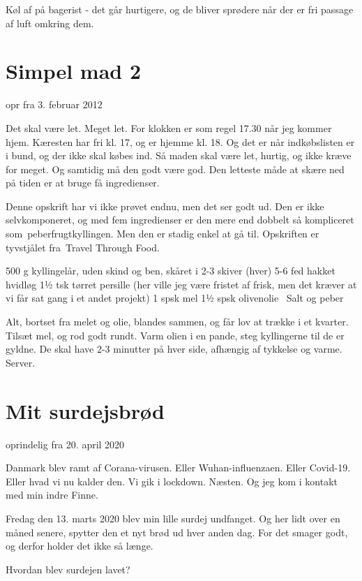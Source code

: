 \documentclass[
  letterpaper,
  DIV=11,
  numbers=noendperiod]{scrreprt}
\begin{document}
Køl af på bagerist - det går hurtigere, og de bliver sprødere når der er
fri passage af luft omkring dem.

\hypertarget{simpel-mad-2}{%
\section{Simpel mad 2}\label{simpel-mad-2}}

opr fra 3. februar 2012

Det skal være let. Meget let. For klokken er som regel 17.30 når jeg
kommer hjem. Kæresten har fri kl. 17, og er hjemme kl. 18. Og det er når
indkøbslisten er i bund, og der ikke skal købes ind. Så maden skal være
let, hurtig, og ikke kræve for meget. Og samtidig må den godt være god.
Den letteste måde at skære ned på tiden er at bruge få ingredienser.~

Denne opskrift har vi ikke prøvet endnu, men det ser godt ud. Den er
ikke selvkomponeret, og med fem ingredienser er den mere end dobbelt så
kompliceret som~peberfrugtkyllingen. Men den er stadig enkel at gå til.
Opskriften er tyvstjålet fra~Travel Through Food.

500 g kyllingelår, uden skind og ben, skåret i 2-3 skiver (hver) 5-6 fed
hakket hvidløg 1½ tsk tørret persille (her ville jeg være fristet af
frisk, men det kræver at vi får sat gang i et andet projekt) 1 spsk mel
1½ spsk olivenolie~ Salt og peber

Alt, bortset fra melet og olie, blandes sammen, og får lov at trække i
et kvarter. Tilsæt mel, og rod godt rundt. Varm olien i en pande, steg
kyllingerne til de er gyldne. De skal have 2-3 minutter på hver side,
afhængig af tykkelse og varme. Server.

\hypertarget{mit-surdejsbruxf8d-1}{%
\section{Mit surdejsbrød}\label{mit-surdejsbruxf8d-1}}

oprindelig fra 20. april 2020

Danmark blev ramt af Corana-virusen. Eller Wuhan-influenzaen. Eller
Covid-19. Eller hvad vi nu kalder den. Vi gik i lockdown. Næsten. Og jeg
kom i kontakt med min indre Finne.

Fredag den 13. marts 2020 blev min lille surdej undfanget. Og her lidt
over en måned senere, spytter den et nyt brød ud hver anden dag. For det
smager godt, og derfor holder det ikke så længe.

Hvordan blev surdejen lavet?
\end{document}
